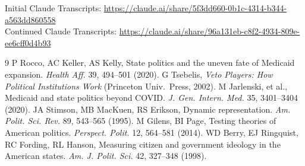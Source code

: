 \documentclass[9pt,twoside]{pnas-new}
\begin{document}
Initial Claude Transcripts: \url{https://claude.ai/share/5f3dd660-0b1c-4314-b344-a563dd860558} \\
Continued Claude Transcripts: \url{https://claude.ai/share/96a131eb-c8f2-4934-809e-ee6cff0d4b93}


\showmatmethods

\begin{thebibliography}{9}
 P Rocco, AC Keller, AS Kelly, State politics and the uneven fate of Medicaid expansion. \emph{Health Aff.} 39, 494--501 (2020).
 G Tsebelis, \emph{Veto Players: How Political Institutions Work} (Princeton Univ.\ Press, 2002).
 M Jarlenski, et al., Medicaid and state politics beyond COVID. \emph{J. Gen. Intern. Med.} 35, 3401--3404 (2020).
 JA Stimson, MB MacKuen, RS Erikson, Dynamic representation. \emph{Am. Polit. Sci. Rev.} 89, 543--565 (1995).
 M Gilens, BI Page, Testing theories of American politics. \emph{Perspect. Polit.} 12, 564--581 (2014).
 WD Berry, EJ Ringquist, RC Fording, RL Hanson, Measuring citizen and government ideology in the American states. \emph{Am. J. Polit. Sci.} 42, 327--348 (1998).
\end{thebibliography}
\end{document}
